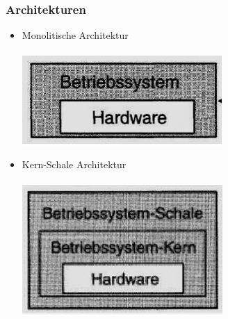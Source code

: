 \subsubsection{Architekturen}
\begin{minipage}{0.3\textwidth}
    \begin{itemize}
        \item Monolitische Architektur\\\\ \includegraphics[width=0.6\textwidth]{images/Betriebssysteme/Monolitische_Architektur.png}
        \item Kern-Schale Architektur\\\\
        \includegraphics[width=0.6\textwidth]{images/Betriebssysteme/Kern-Schale_Architektur.png} \\ \\ \\ \\ \\ \\
    \end{itemize}
\end{minipage}
\hfill
